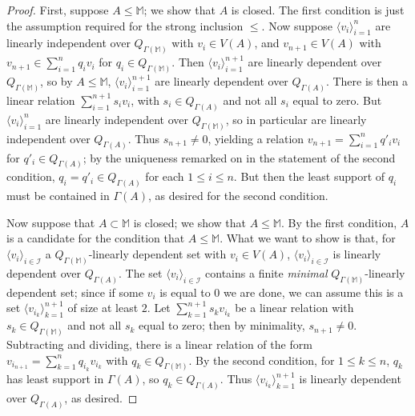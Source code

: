 \documentclass{amsart}
\theoremstyle{definition}
\theoremstyle{remark}
\numberwithin{equation}{section}
\begin{document}
\begin{proof}
 First, suppose $A \leq \mathbb{M}$; we show that $A$ is closed. The first condition is just the assumption required for the strong inclusion $\leq$. Now suppose  $\langle v_{i}\rangle^{n}_{i = 1}$ are linearly independent over $Q_{\Gamma(\mathbb{M})}$ with $v_{i} \in V(A)$, and $v_{n+1} \in V(A)$ with $v_{n+1} \in \sum^{n}_{i=1} q_{i}v_{i}$ for $q_{i} \in Q_{\Gamma(\mathbb{M})}$. Then $\langle v_{i}\rangle^{n+1}_{i = 1}$ are linearly dependent over $Q_{\Gamma(\mathbb{M})}$, so by $A \leq \mathbb{M}$, $\langle v_{i}\rangle^{n+1}_{i = 1}$ are linearly dependent over $Q_{\Gamma(A)}$. There is then a linear relation $\sum^{n+1}_{i = 1}s_{i}v_{i}$, with $s_{i} \in Q_{\Gamma(A)}$ and not all $s_{i}$ equal to zero. But $\langle v_{i}\rangle^{n}_{i = 1}$ are linearly independent over $Q_{\Gamma(\mathbb{M})}$, so in particular are linearly independent over $Q_{\Gamma(A)}$. Thus $s_{n+1} \neq 0$, yielding a relation $v_{n+1} = \sum^{n}_{i=1} q'_{i}v_{i}$ for $q'_{i} \in Q_{\Gamma(A)}$; by the uniqueness remarked on in the statement of the second condition, $q_{i} = q'_{i} \in  Q_{\Gamma(A)} $ for each $1 \leq i \leq n$. But then the least support of $q_{i}$ must be contained in $\Gamma(A)$, as desired for the second condition.

Now suppose that $A \subset \mathbb{M}$ is closed; we show that $A \leq \mathbb{M}$. By the first condition, $A$ is a candidate for the condition that $A \leq \mathbb{M}$. What we want to show is that, for $\langle v_{i}\rangle_{i \in \mathcal{I}}$ a $Q_{\Gamma(\mathbb{M})}$-linearly dependent set with $v_{i} \in V(A)$, $\langle v_{i}\rangle_{i \in \mathcal{I}}$ is linearly dependent over $Q_{\Gamma(A)}$. The set $\langle v_{i}\rangle_{i \in \mathcal{I}}$ contains a finite \textit{minimal} $Q_{\Gamma(\mathbb{M})}$-linearly dependent set; since if some $v_{i}$ is equal to $0$ we are done, we can assume this is a set $\langle v_{i_{k}}\rangle^{n+1}_{k =1}$ of size at least $2$. Let $\sum^{n+1}_{k = 1}s_{k}v_{i_{k}}$ be a linear relation with $s_{k} \in Q_{\Gamma(\mathbb{M})}$ and not all $s_{k}$ equal to zero; then by minimality, $s_{n+1} \neq 0$. Subtracting and dividing, there is a linear relation of the form $v_{i_{n+1}} = \sum^{n}_{k=1} q_{i_{k}}v_{i_{k}}$ with $q_{k} \in Q_{\Gamma(\mathbb{M})}$. By the second condition, for $1 \leq k \leq n$, $q_{k}$ has least support in $\Gamma(A)$, so $q_{k} \in Q_{\Gamma(A)}$. Thus $\langle v_{i_{k}}\rangle^{n+1}_{k =1}$ is linearly dependent over $Q_{\Gamma(A)}$, as desired.

    
\end{proof}
\end{document}
